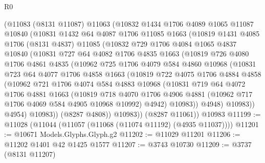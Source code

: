\begin{lexlean}{R0}
\begin{coremodule}
    (@11083
      (@8131 @11087)
      @11063
      (@10832
        @1434
        @1706
        @4089
        @1065
        @11087
        @10840
        (@10831
          @1432
          @64
          @4087
          @1706
          @11085
          @1663
          (@10819
            @1431
            @4085
            @1706
            (@8131 @4837)
            @11085
            (@10832
              @729
              @1706
              @4084
              @1065
              @4837
              @10840
              (@10831
                @727
                @64
                @4082
                @1706
                @4835
                @1663
                (@10819
                  @726
                  @4080
                  @1706
                  @4861
                  @4835
                  (@10962
                    @725
                    @1706
                    @4079
                    @584
                    @4860
                    @10968
                    (@10831
                      @723
                      @64
                      @4077
                      @1706
                      @4858
                      @1663
                      (@10819
                        @722
                        @4075
                        @1706
                        @4884
                        @4858
                        (@10962
                          @721
                          @1706
                          @4074
                          @584
                          @4883
                          @10968
                          (@10831
                            @719
                            @64
                            @4072
                            @1706
                            @4881
                            @1663
                            (@10819
                              @718
                              @4070
                              @1706
                              @4906
                              @4881
                              (@10962 @717 @1706 @4069 @584 @4905 @10968 @10992)
                              @4942)
                            @10983))
                        @4948)
                      @10983))
                  @4954)
                @10983))
            (@8287 @4808))
          @10983))
      (@8287 @11061))
    @10983
@11199 := @11028 (@11044 (@11057 (@11068 (@11074 @11192) (@4935 @11037))))
@11201 := @10671 Models.Glyphs.Glyph.g2
@11202 := @11029 @11201
@11206 := @11202 @1401 @42 @1425 @1577
@11207 := @3743 @10730
@11209 := @3737 (@8131 @11207)

\end{coremodule}
\end{lexlean}
